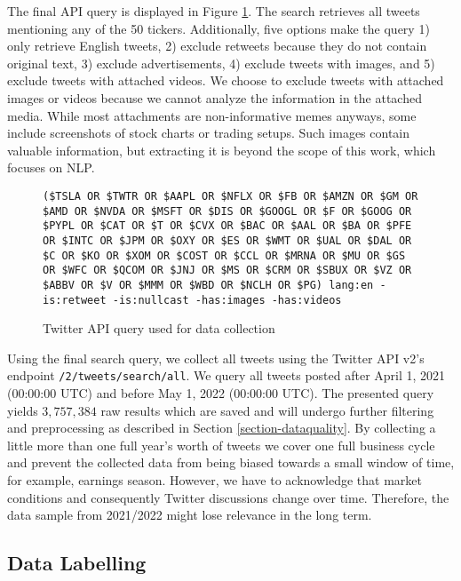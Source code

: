 The final API query is displayed in Figure \ref{figure-api-query}. The search retrieves all tweets mentioning any of the 50 tickers. Additionally, five options make the query 1) only retrieve English tweets, 2) exclude retweets because they do not contain original text, 3) exclude advertisements, 4) exclude tweets with images, and 5) exclude tweets with attached videos. We choose to exclude tweets with attached images or videos because we cannot analyze the information in the attached media. While most attachments are non-informative memes anyways, some include screenshots of stock charts or trading setups. Such images contain valuable information, but extracting it is beyond the scope of this work, which focuses on NLP.

\begin{figure}[!ht]
	\begin{tcolorbox}
	\small
	\centering
\texttt{(\$TSLA OR \$TWTR OR \$AAPL OR \$NFLX OR \$FB OR \$AMZN OR \$GM OR \$AMD OR \$NVDA OR \$MSFT OR \$DIS OR \$GOOGL OR \$F OR \$GOOG OR \$PYPL OR \$CAT OR \$T OR \$CVX OR \$BAC OR \$AAL OR \$BA OR \$PFE OR \$INTC OR \$JPM OR \$OXY OR \$ES OR \$WMT OR \$UAL OR \$DAL OR \$C OR \$KO OR \$XOM OR \$COST OR \$CCL OR \$MRNA OR \$MU OR \$GS OR \$WFC OR \$QCOM OR \$JNJ OR \$MS OR \$CRM OR \$SBUX OR \$VZ OR \$ABBV OR \$V OR \$MMM OR \$WBD OR \$NCLH OR \$PG) lang:en -is:retweet -is:nullcast -has:images -has:videos}
	\end{tcolorbox}
	\caption{Twitter API query used for data collection}
	\label{figure-api-query}
\end{figure}

Using the final search query, we collect all tweets using the Twitter API v2's endpoint \texttt{/2/tweets/search/all}. We query all tweets posted after April 1, 2021 (00:00:00 UTC) and before May 1, 2022 (00:00:00 UTC). The presented query yields $3,757,384$ raw results which are saved and will undergo further filtering and preprocessing as described in Section \ref{section-dataquality}. 
 By collecting a little more than one full year's worth of tweets we cover one full business cycle and prevent the collected data from being biased towards a small window of time, for example, earnings season. However, we have to acknowledge that market conditions and consequently Twitter discussions change over time. Therefore, the data sample from 2021/2022 might lose relevance in the long term.


\subsection{Data Labelling}

